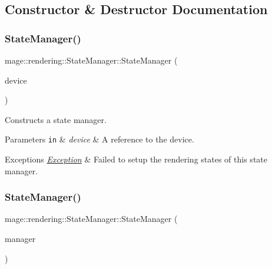 \subsection{Constructor \& Destructor Documentation}
\mbox{\label{classmage_1_1rendering_1_1_state_manager_ae19649b2bfc0fc7eb3110fb85cda26b7}} 
\subsubsection{\texorpdfstring{State\+Manager()}{StateManager()}\hspace{0.1cm}{\footnotesize\ttfamily [1/3]}}
{\footnotesize\ttfamily mage\+::rendering\+::\+State\+Manager\+::\+State\+Manager (\begin{DoxyParamCaption}\item[{I\+D3\+D11\+Device \&}]{device }\end{DoxyParamCaption})\hspace{0.3cm}{\ttfamily [explicit]}}

Constructs a state manager.


\begin{DoxyParams}[1]{Parameters}
\mbox{\tt in}  & {\em device} & A reference to the device. \\
\hline
\end{DoxyParams}

\begin{DoxyExceptions}{Exceptions}
{\em \mbox{\hyperlink{classmage_1_1_exception}{Exception}}} & Failed to setup the rendering states of this state manager. \\
\hline
\end{DoxyExceptions}
\mbox{\label{classmage_1_1rendering_1_1_state_manager_aa5e404cde4e010a5738815d1d4938585}} 
\subsubsection{\texorpdfstring{State\+Manager()}{StateManager()}\hspace{0.1cm}{\footnotesize\ttfamily [2/3]}}
{\footnotesize\ttfamily mage\+::rendering\+::\+State\+Manager\+::\+State\+Manager (\begin{DoxyParamCaption}\item[{const \mbox{\hyperlink{classmage_1_1rendering_1_1_state_manager}{State\+Manager}} \&}]{manager }\end{DoxyParamCaption})\hspace{0.3cm}{\ttfamily [delete]}}

